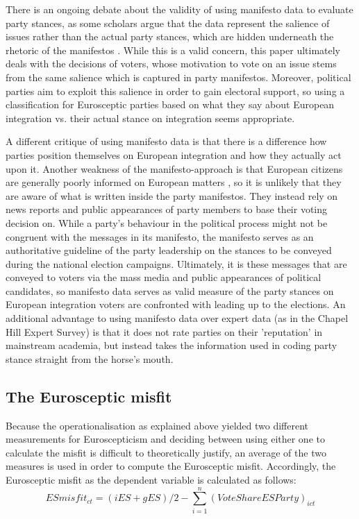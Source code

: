 There is an ongoing debate about the validity of using manifesto data to evaluate party stances, as some scholars argue that the data represent the salience of issues rather than the actual party stances, which are hidden underneath the rhetoric of the manifestos \cite{Dalton2008}. While this is a valid concern, this paper ultimately deals with the decisions of voters, whose motivation to vote on an issue stems from the same salience which is captured in party manifestos. Moreover, political parties aim to exploit this salience in order to gain electoral support, so using a classification for Eurosceptic parties based on what they say about European integration vs. their actual stance on integration seems appropriate. 

A different critique of using manifesto data is that there is a difference how parties position themselves on European integration and how they actually act upon it. Another weakness of the manifesto-approach is that European citizens are generally poorly informed on European matters \cite{Hobolt2011}, so it is unlikely that they are aware of what is written inside the party manifestos. They instead rely on news reports and public appearances of party members to base their voting decision on. While a party's behaviour in the political process might not be congruent with the messages in its manifesto, the manifesto serves as an authoritative guideline of the party leadership on the stances to be conveyed during the national election campaigns. Ultimately, it is these messages that are conveyed to voters via the mass media and public appearances of political candidates, so manifesto data serves as valid measure of the party stances on European integration voters are confronted with leading up to the elections. An additional advantage to using manifesto data over expert data (as in the Chapel Hill Expert Survey) is that it does not rate parties on their 'reputation' in mainstream academia, but instead takes the information used in coding party stance straight from the horse's mouth. 

\subsection{The Eurosceptic misfit}
Because the operationalisation as explained above yielded two different measurements for Euroscepticism and deciding between using either one to calculate the misfit is difficult to theoretically justify, an average of the two measures is used in order to compute the Eurosceptic misfit. Accordingly, the Eurosceptic misfit as the dependent variable is calculated as follows: 
\begin{equation}
	ESmisfit_{ct} = (iES + gES) / 2 - \sum_{i=1}^n(VoteShareESParty)_{ict}
\end{equation}


